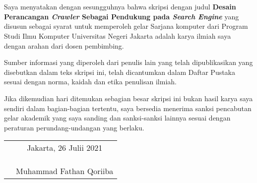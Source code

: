 \chapter*{}

Saya menyatakan dengan sesungguhnya bahwa skripsi dengan judul 	\textbf{Desain Perancangan \emph{Crawler} Sebagai Pendukung pada \emph{Search Engine}} yang disusun sebagai syarat untuk memperoleh gelar Sarjana komputer dari Program Studi Ilmu Komputer Universitas Negeri Jakarta adalah karya ilmiah saya dengan arahan dari dosen pembimbing.

Sumber informasi yang diperoleh dari penulis lain yang
telah dipublikasikan yang disebutkan dalam teks skripsi ini, telah dicantumkan dalam Daftar Pustaka sesuai dengan norma, kaidah dan etika penulisan ilmiah.

Jika dikemudian hari ditemukan sebagian besar skripsi ini bukan hasil karya saya sendiri dalam bagian-bagian tertentu, saya bersedia menerima sanksi pencabutan gelar akademik yang saya sanding dan sanksi-sanksi lainnya sesuai dengan peraturan perundang-undangan yang berlaku.

\vspace{.5cm}

\begin{tabular}{p{7.5cm}c}
	&Jakarta, 26 Julii 2021\\
	&\\
	&\\
	&\\
	&Muhammad Fathan Qoriiba
\end{tabular}